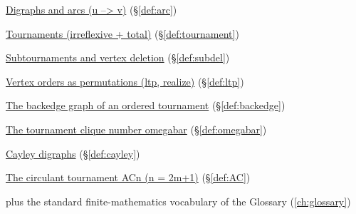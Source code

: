 \begin{closurepanel}
\item \hyperref[def:arc]{Digraphs and arcs (u --> v)} (\S\ref*{def:arc})
\item \hyperref[def:tournament]{Tournaments (irreflexive + total)} (\S\ref*{def:tournament})
\item \hyperref[def:subdel]{Subtournaments and vertex deletion} (\S\ref*{def:subdel})
\item \hyperref[def:ltp]{Vertex orders as permutations (ltp, realize)} (\S\ref*{def:ltp})
\item \hyperref[def:backedge]{The backedge graph of an ordered tournament} (\S\ref*{def:backedge})
\item \hyperref[def:omegabar]{The tournament clique number omegabar} (\S\ref*{def:omegabar})
\item \hyperref[def:cayley]{Cayley digraphs} (\S\ref*{def:cayley})
\item \hyperref[def:AC]{The circulant tournament ACn (n = 2m+1)} (\S\ref*{def:AC})
\item plus the standard finite-mathematics vocabulary of the Glossary (\cref{ch:glossary})
\end{closurepanel}
